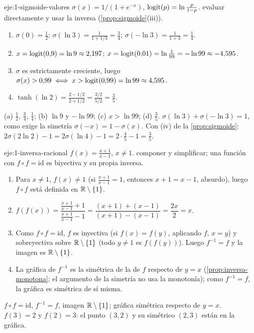\begin{solucion}{eje:1-sigmoide-valores}
\datos $\sigma(x)=1/(1+e^{-x})$, $\operatorname{logit}(p)=\ln\frac{p}{1-p}$.
\planteamiento evaluar directamente y usar la inversa (\cref{prop:sigmoide}(iii)).
\pasos
\begin{enumerate}[label=(\alph*)]
  \item $\sigma(0)=\frac12$; $\sigma(\ln3)=\frac{1}{1+1/3}=\frac34$; $\sigma(-\ln3)=\frac{1}{1+3}=\frac14$.
  \item $x=\operatorname{logit}(0{,}9)=\ln9\approx2{,}197$; $x=\operatorname{logit}(0{,}01)=\ln\frac{1}{99}=-\ln99\approx-4{,}595$.
  \item $\sigma$ es estrictamente creciente, luego $\sigma(x)>0{,}99\iff x>\operatorname{logit}(0{,}99)=\ln99\approx4{,}595$.
  \item $\tanh(\ln2)=\frac{2-1/2}{2+1/2}=\frac{3/2}{5/2}=\frac35$.
\end{enumerate}
\resultado (a) $\tfrac12$, $\tfrac34$, $\tfrac14$; (b) $\ln9$ y $-\ln99$; (c) $x>\ln99$; (d) $\tfrac35$.
\comprobacion $\sigma(\ln3)+\sigma(-\ln3)=1$, como exige la simetría $\sigma(-x)=1-\sigma(x)$. Con (iv) de la \cref{prop:sigmoide}: $2\sigma(2\ln2)-1=2\sigma(\ln4)-1=2\cdot\frac45-1=\frac35$.
\end{solucion}

\begin{solucion}{eje:1-inversa-racional}
\datos $f(x)=\frac{x+1}{x-1}$, $x\ne1$.
\planteamiento componer y simplificar; una función con $f\circ f=\mathrm{id}$ es biyectiva y su propia inversa.
\pasos
\begin{enumerate}[label=\arabic*.]
  \item Para $x\ne1$, $f(x)\ne1$ (si $\frac{x+1}{x-1}=1$, entonces $x+1=x-1$, absurdo), luego $f\circ f$ está definida en $\mathbb{R}\setminus\{1\}$.
  \item $f(f(x))=\dfrac{\frac{x+1}{x-1}+1}{\frac{x+1}{x-1}-1}=\dfrac{(x+1)+(x-1)}{(x+1)-(x-1)}=\dfrac{2x}{2}=x$.
  \item Como $f\circ f=\mathrm{id}$, $f$ es inyectiva (si $f(x)=f(y)$, aplicando $f$, $x=y$) y sobreyectiva sobre $\mathbb{R}\setminus\{1\}$ (todo $y\ne1$ es $f(f(y))$). Luego $f^{-1}=f$ y la imagen es $\mathbb{R}\setminus\{1\}$.
  \item La gráfica de $f^{-1}$ es la simétrica de la de $f$ respecto de $y=x$ (\cref{prop:inversa-monotona}; el argumento de la simetría no usa la monotonía); como $f^{-1}=f$, la gráfica es simétrica de sí misma.
\end{enumerate}
\resultado $f\circ f=\mathrm{id}$, $f^{-1}=f$, imagen $\mathbb{R}\setminus\{1\}$; gráfica simétrica respecto de $y=x$.
\comprobacion $f(3)=2$ y $f(2)=3$: el punto $(3,2)$ y su simétrico $(2,3)$ están en la gráfica.
\end{solucion}

